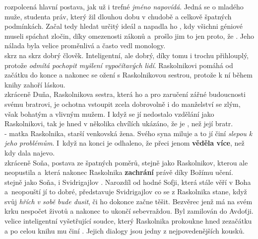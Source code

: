 \documentclass[FGBook.tex]{subfiles}
\begin{document}
\noindent 
{} rozpolcená hlavní postava, jak už i trefné \textit{jméno napovídá}.
Jedná se o mladého muže, studenta práv, který žil dlouhou dobu v chudobě a celkově špatných podmínkách.
Začal tedy hledat určitý ideál a napadla ho , kdy všichni géniové museli spáchat zločin, díky omezenosti zákonů a~prošlo jim to jen proto, že .
Jeho nálada byla velice proměnlivá a často vedl monology. \\
 skrz na skrz dobrý člověk.
Inteligentní, ale dobrý, díky tomu i trochu přihlouplý, protože \textit{odmítá pochopit myšlení vypočítavých lidí}.
Raskolnikovi pomáhá od začátku do konce a nakonec se ožení s Raskolnikovou sestrou, protože k ní během knihy zahoří láskou. \\
 zkráceně Duňa, Raskolnikova sestra, která ho  a pro zaručení zářné budoucnosti svému bratrovi, je ochotna vstoupit zcela dobrovolně i do manželství se zlým, však bohatým a vlivným mužem.
I když se jí nedostalo vzdělání jako Raskolnikovi, tak je hned v několika chvílích ukázáno, že je , než její bratr. \\
 - matka Raskolnika, starší venkovská žena.
Svého syna miluje a to jí činí \textit{slepou k jeho problémům}.
I~když na konci je odhaleno, že přeci jenom \textbf{věděla více}, než kdy dala najevo. \\
 zkráceně Soňa, postava ze špatných poměrů, stejně jako Raskolnikov, kterou ale neopustila  a~která nakonec Raskolnika \textbf{zachrání} právě díky Božímu učení. \\
 stejně jako Soňa, i Svidrigajlov .
Narozdíl od hodné Sofji, která stále věří v Boha a~neopouští jí to dobré, představuje Svidrigajlov co se z Raskolnika stane, když svůj \textit{hřích v sobě bude dusit}, či ho dokonce začne těšit.
Bezvěrec jenž má na svém krku nespočet životů a nakonec to ukončí sebevraždou.
Byl zamilován do Avdoťji. \\
 velice inteligentní vyšetřující soudce, který Raskolnika prokoukne hned zezačátku a po celou knihu mu činí .
Jejich dialogy jsou jedny z nejpovedenějších kousků.
\end{document}
